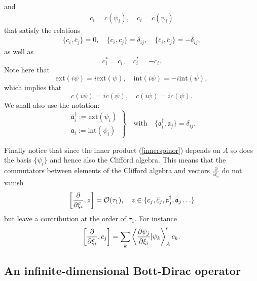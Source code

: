 \documentclass[12pt]{article}
\def\d{\delta}
\def\co{{\cal O}}
\newcommand{\pa}{\partial}
\begin{document}
and 
\begin{eqnarray}
c_i =  c(\psi_i) 
,\quad
\bar{c}_i = \bar{c}(\psi_i) 
\end{eqnarray}
that satisfy the relations 
\begin{eqnarray}
 \{c_i, \bar{c}_j\} = 0, \quad
 \{c_i, c_j\} = \d_{ij}, \quad
 \{\bar{c}_i, \bar{c}_j\} =- \d_{ij},
 \label{mangec}
\end{eqnarray}
as well as
$$
c_i^*= c_i, \quad \bar{c}_i^* = - \bar{c}_i.
$$
Note here that 
$$
\mbox{ext}(i\psi)= i\mbox{ext}(\psi) ,\quad  \mbox{int}(i\psi) =  -  i\mbox{int}(\psi),
$$
which implies that
\begin{equation}
c(i\psi) = i \bar{c}(\psi), \quad \bar{c}(i\psi) = i c(\psi).
\label{signc}
\end{equation}
We shall also use the notation:
\begin{equation}
\left.
\begin{array}{c}
\mathfrak{a}^\dagger_i:= \mbox{ext}(\psi_i)
\\
\mathfrak{a}_i:=  \mbox{int}(\psi_i)
\end{array}
\right\}
\quad
\mbox{with}
\quad
\{\mathfrak{a}^\dagger_i,\mathfrak{a}_j\} = \d_{ij}.
\label{rolignu}
\end{equation}

Finally notice that since the inner product (\ref{innerspinor}) depends on $A$ so does the basis $\{\psi_i\}$ and hence also the Clifford algebra. This means that the commutators between elements of the Clifford algebra and vectors $\frac{\pa}{\pa \xi_i}$ do not vanish
\begin{equation}
\left[ \frac{\pa}{\pa \xi_i}, z \right]= \co(\tau_1) ,\quad  z  \in \{c_j, \bar{c}_j, \mathfrak{a}^\dagger_j, \mathfrak{a}_j  \ldots \}
\label{nonzero}
\end{equation}
but leave a contribution at the order of $\tau_1$. For instance
$$
\left[ \frac{\pa}{\pa \xi_i}, c_j \right] = \sum_k \left\langle \frac{\pa \psi_j }{\pa \xi_i} \vert \psi_k \right\rangle_{A}^{\mbox{\tiny S}}  c_k .
$$










\subsection{An infinite-dimensional Bott-Dirac operator}
\end{document}
